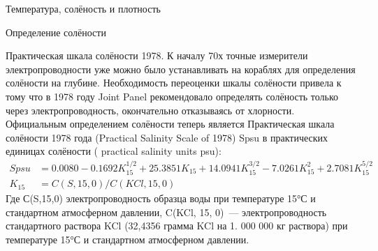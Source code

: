 \begin{chapter}{Температура, солёность и плотность}
\begin{section}{Определение солёности}
\begin{paragraph}{Практическая шкала солёности 1978.}
К началу 70х точные измерители электропроводности уже можно было
устанавливать на кораблях для определения солёности на
глубине. Необходимость переоценки шкалы солёности привела к тому что в
1978 году Joint Panel рекомендовало определять солёность только через
электропроводность, окончательно отказываясь от хлорности. Официальным
определением солёности теперь является Практическая шкала солёности
1978 года (Practical Salinity Scale of 1978) Spsu в практических
единицах солёности ( practical salinity units psu):
\begin{subequations}
\begin{align}
Spsu & = 0.0080 - 0.1692K_{15}^{1/2} + 25.3851K_{15} + 14.0941K_{15}^{3/2}
       -7.0261K_{15}^2 + 2.7081K_{15}^{5/2} \\
K_{15} & = C(S,15,0)/C(KCl,15,0)
\end{align}
\end{subequations}
Где С(S,15,0) электропроводность образца воды при температуре 15°С и
стандартном атмосферном давлении, C(KCl, 15, 0)~--- электропроводность
стандартного раствора KCl (32,4356 грамма KCl на 1. 000 000 кг
раствора) при температуре 15°С и стандартном атмосферном давлении.
%
% 

\end{paragraph}
\end{section}
\end{chapter}
